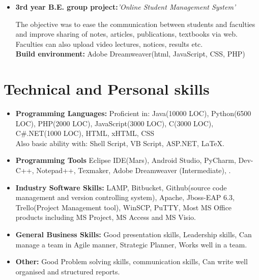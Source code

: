 \documentclass[11pt,a4paper,sans]{moderncv}        %
\begin{document}
\begin{itemize}
\vspace{8pt}

\item{\textbf{3rd year B.E. group project:}\textit{'Online Student Management System'}

\vspace{3pt}

\small{The objective was to ease the communication between students and faculties and improve sharing of notes, articles, publications, textbooks via web. Faculties can also upload video lectures, notices, results etc.}
\\ \textbf{Build environment:} Adobe Dreamweaver(html, JavaScript, CSS, PHP)
}

\end{itemize}

\section{Technical and Personal skills}

\vspace{8pt}

\begin{itemize}

\item \textbf{Programming Languages:} Proficient in: Java(10000 LOC), Python(6500 LOC), PHP(2000 LOC), JavaScript(3000 LOC), C(3000 LOC), C\#.NET(1000 LOC), HTML, xHTML, CSS \\ Also basic ability with: Shell Script, VB Script, ASP.NET, LaTeX.

\vspace{8pt}

\item \textbf{Programming Tools} Eclipse IDE(Mars), Android Studio, PyCharm, Dev-C++, Notepad++, Texmaker, Adobe Dreamweaver (Intermediate), .

\vspace{8pt}

\item \textbf{Industry Software Skills:} LAMP, Bitbucket, Github(source code management and version controlling system), Apache, Jboss-EAP 6.3, Trello(Project Management tool), WinSCP, PuTTY, Most MS Office products including MS Project, MS Access and MS Visio.

\vspace{8pt}

\item \textbf{General Business Skills:} Good presentation skills, Leadership skills, Can manage a team in Agile manner, Strategic Planner, Works well in a team.

\vspace{8pt}

\item \textbf{Other:} Good Problem solving skills, communication skills, Can write well organised and structured reports.

\end{itemize}
\end{document}
